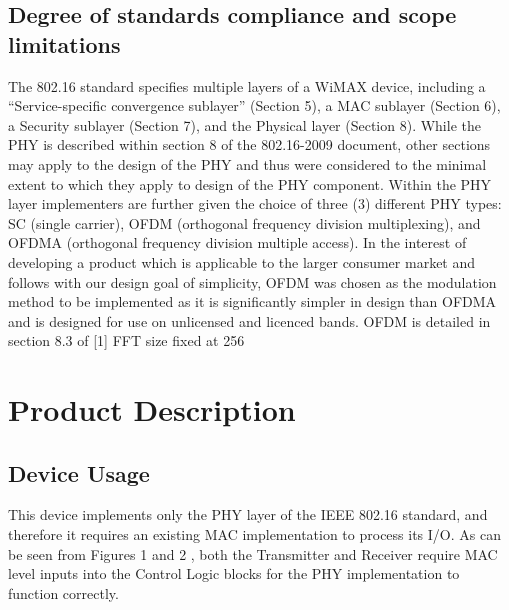 ﻿\documentclass[10pt]{article}
\begin{document}
\subsection{Degree of standards compliance and scope limitations}
The 802.16 standard specifies multiple layers of a WiMAX device, including a “Service-specific convergence sublayer” (Section 5), a MAC sublayer (Section 6), a Security sublayer (Section 7), and the Physical layer (Section 8). While the PHY is described within section 8 of the 802.16-2009 document, other sections may apply to the design of the PHY and thus were considered to the minimal extent to which they apply to design of the PHY component.
Within the PHY layer implementers are further given the choice of three (3) different PHY types: SC (single carrier), OFDM (orthogonal frequency division multiplexing), and OFDMA (orthogonal frequency division multiple access). In the interest of developing a product which is applicable to the larger consumer market and follows with our design goal of simplicity, OFDM was chosen as the modulation method to be implemented as it is significantly simpler in design than OFDMA and is designed for use on unlicensed and licenced bands. OFDM is detailed in section 8.3 of [1]
FFT size fixed at 256
\newpage
\section{Product Description}
\subsection{Device Usage}
This device implements only the PHY layer of the IEEE 802.16 standard, and therefore it requires an existing MAC implementation to process its I/O. As can be seen from Figures 1 and 2 %
, both the Transmitter and Receiver require MAC level inputs into the Control Logic blocks for the PHY implementation to function correctly.
\end{document}
